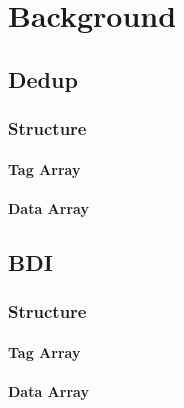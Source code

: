 
\chapter{Background}
\label{ch:Background}

\section{Dedup}
\label{sec:Dedup}
\subsection{Structure}
\label{ssec:DedupStructure}
\subsubsection{Tag Array}
\label{sssec:DedupTag}
\subsubsection{Data Array}
\label{sssec:DedupData}

\section{BDI}
\label{sec:BDI}
\subsection{Structure}
\label{ssec:BDIStructure}
\subsubsection{Tag Array}
\label{sssec:BDITag}
\subsubsection{Data Array}
\label{sssec:BDIData}
